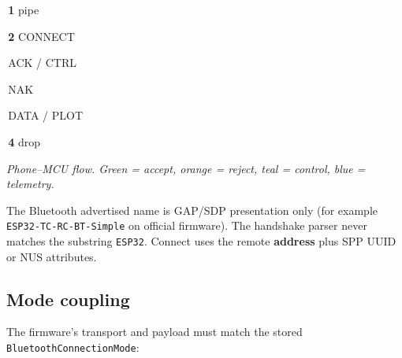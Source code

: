 \documentclass[12pt,a4paper]{article}
\newcommand{\chip}[2]{\colorbox{#1}{\strut\,\scriptsize #2\,}}
\begin{document}
\begin{center}

\vspace{0.3em}
{\sffamily\scriptsize
\chip{TblHead!18}{\textcolor{TblHead}{\textbf{1} pipe}}
\chip{TblSync}{\textbf{2} CONNECT}
\chip{TblChan}{ACK / CTRL}
\chip{TblId}{NAK}
\chip{TblTelem}{DATA / PLOT}
\chip{TblSum}{\textbf{4} drop}}

\vspace{0.15em}
{\sffamily\scriptsize\itshape
Phone--MCU flow. Green = accept, orange = reject, teal = control, blue = telemetry.}
\end{center}

The Bluetooth advertised name is GAP/SDP presentation only
(for example \texttt{ESP32-TC-RC-BT-Simple} on official firmware).
The handshake parser never matches the substring \texttt{ESP32}.
Connect uses the remote \textbf{address} plus SPP UUID or NUS attributes.

\subsection{Mode coupling}

The firmware's transport and payload must match the stored
\texttt{BluetoothConnectionMode}:
\end{document}
